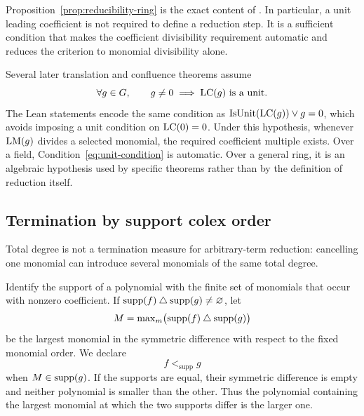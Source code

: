 Proposition~\ref{prop:reducibility-ring} is the exact content of
.
In particular, a unit leading coefficient is not required to define a
reduction step.  It is a sufficient condition that makes the coefficient
divisibility requirement automatic and reduces the criterion to monomial
divisibility alone.

\begin{remark}
\label{rem:unit-condition}
Several later translation and confluence theorems assume
\begin{equation}\label{eq:unit-condition}
  \forall g\in G,\qquad
  g\neq0\;\Longrightarrow\;\operatorname{LC}(g)\text{ is a unit}.
\end{equation}
The Lean statements encode the same condition as
\(
  \operatorname{IsUnit}(\operatorname{LC}(g))\lor g=0
\), which avoids imposing a unit condition on \(\operatorname{LC}(0)=0\).  Under this
hypothesis, whenever $\operatorname{LM}(g)$ divides a selected monomial, the required
coefficient multiple exists.  Over a field, Condition~\eqref{eq:unit-condition}
is automatic.  Over a general ring, it is an algebraic hypothesis used by
specific theorems rather than by the definition of reduction itself.
\end{remark}

\subsection{Termination by support colex order}

Total degree is not a termination measure for arbitrary-term reduction:
cancelling one monomial can introduce several monomials of the same total
degree.

\begin{definition}
\label{def:support-colex}
Identify the support of a polynomial with the finite set of monomials that
occur with nonzero coefficient.  If
$\operatorname{supp}(f)\mathbin{\triangle}\operatorname{supp}(g)\neq\varnothing$, let
\[
  M=\max\nolimits_m\bigl(\operatorname{supp}(f)\mathbin{\triangle}\operatorname{supp}(g)\bigr)
\]
be the largest monomial in the symmetric difference with respect to the fixed
monomial order.  We declare
\[
  f<_{\mathrm{supp}}g
\]
when $M\in\operatorname{supp}(g)$.  If the supports are equal, their symmetric difference is
empty and neither polynomial is smaller than the other.  Thus the polynomial
containing the largest monomial at which the two supports differ is the larger
one.
\end{definition}

